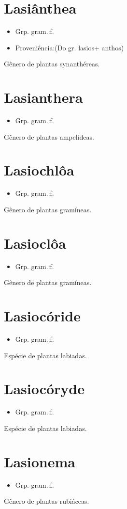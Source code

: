 \section{Lasiânthea}
\begin{itemize}
\item {Grp. gram.:f.}
\end{itemize}
\begin{itemize}
\item {Proveniência:(Do gr. \textunderscore lasios\textunderscore  + \textunderscore anthos\textunderscore )}
\end{itemize}
Gênero de plantas synanthéreas.
\section{Lasianthera}
\begin{itemize}
\item {Grp. gram.:f.}
\end{itemize}
Gênero de plantas ampelídeas.
\section{Lasiochlôa}
\begin{itemize}
\item {Grp. gram.:f.}
\end{itemize}
Gênero de plantas gramíneas.
\section{Lasioclôa}
\begin{itemize}
\item {Grp. gram.:f.}
\end{itemize}
Gênero de plantas gramíneas.
\section{Lasiocóride}
\begin{itemize}
\item {Grp. gram.:f.}
\end{itemize}
Espécie de plantas labiadas.
\section{Lasiocóryde}
\begin{itemize}
\item {Grp. gram.:f.}
\end{itemize}
Espécie de plantas labiadas.
\section{Lasionema}
\begin{itemize}
\item {Grp. gram.:f.}
\end{itemize}
Gênero de plantas rubiáceas.
